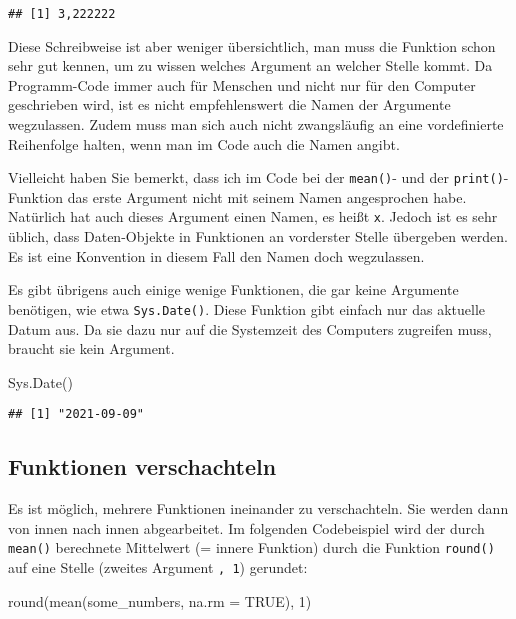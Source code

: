 \documentclass[
]{book}
\newenvironment{Shaded}{\begin{snugshade}}{\end{snugshade}}
\newcommand{\AttributeTok}[1]{\textcolor[rgb]{0.77,0.63,0.00}{#1}}
\newcommand{\ConstantTok}[1]{\textcolor[rgb]{0.00,0.00,0.00}{#1}}
\newcommand{\DecValTok}[1]{\textcolor[rgb]{0.00,0.00,0.81}{#1}}
\newcommand{\FunctionTok}[1]{\textcolor[rgb]{0.00,0.00,0.00}{#1}}
\newcommand{\NormalTok}[1]{#1}
\begin{document}
\begin{verbatim}
## [1] 3,222222
\end{verbatim}

Diese Schreibweise ist aber weniger übersichtlich, man muss die Funktion schon sehr gut kennen, um zu wissen welches Argument an welcher Stelle kommt. Da Programm-Code immer auch für Menschen und nicht nur für den Computer geschrieben wird, ist es nicht empfehlenswert die Namen der Argumente wegzulassen. Zudem muss man sich auch nicht zwangsläufig an eine vordefinierte Reihenfolge halten, wenn man im Code auch die Namen angibt.

Vielleicht haben Sie bemerkt, dass ich im Code bei der \texttt{mean()}- und der \texttt{print()}-Funktion das erste Argument nicht mit seinem Namen angesprochen habe. Natürlich hat auch dieses Argument einen Namen, es heißt \texttt{x}. Jedoch ist es sehr üblich, dass Daten-Objekte in Funktionen an vorderster Stelle übergeben werden. Es ist eine Konvention in diesem Fall den Namen doch wegzulassen.

Es gibt übrigens auch einige wenige Funktionen, die gar keine Argumente benötigen, wie etwa \texttt{Sys.Date()}. Diese Funktion gibt einfach nur das aktuelle Datum aus. Da sie dazu nur auf die Systemzeit des Computers zugreifen muss, braucht sie kein Argument.

\begin{Shaded}
\begin{Highlighting}[]
\FunctionTok{Sys.Date}\NormalTok{()}
\end{Highlighting}
\end{Shaded}

\begin{verbatim}
## [1] "2021-09-09"
\end{verbatim}

\hypertarget{funktionen-verschachteln}{%
\subsection{Funktionen verschachteln}\label{funktionen-verschachteln}}

Es ist möglich, mehrere Funktionen ineinander zu verschachteln. Sie werden dann von innen nach innen abgearbeitet. Im folgenden Codebeispiel wird der durch \texttt{mean()} berechnete Mittelwert (= innere Funktion) durch die Funktion \texttt{round()} auf eine Stelle (zweites Argument \texttt{,\ 1}) gerundet:

\begin{Shaded}
\begin{Highlighting}[]
\FunctionTok{round}\NormalTok{(}\FunctionTok{mean}\NormalTok{(some\_numbers, }\AttributeTok{na.rm =} \ConstantTok{TRUE}\NormalTok{), }\DecValTok{1}\NormalTok{)}
\end{Highlighting}
\end{Shaded}
\end{document}
